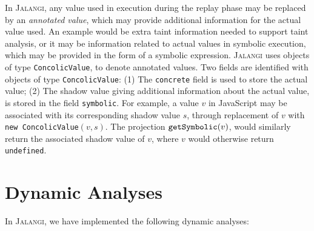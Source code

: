 \documentclass{sig-alternate}
\def\jalangi{\textsc{Jalangi}}
\newcommand \Shadow{{\tt getSymbolic}}
\begin{document}
In \jalangi{}, any value used in execution during the replay phase may
be replaced by an \emph{annotated value}, which may provide additional
information for the actual value used.  An example would be extra
taint information needed to support taint analysis, or it may be
information related to actual values in symbolic execution, which may
be provided in the form of a symbolic expression.  \jalangi{} uses
objects of type \texttt{ConcolicValue}, to denote annotated values.
Two fields are identified with objects of type \texttt{ConcolicValue}:
(1) The \texttt{concrete} field is used to store the actual value; (2)
The shadow value giving additional information about the actual value,
is stored in the field \texttt{symbolic}.  For example, a value $v$ in
JavaScript may be associated with its corresponding shadow value $s$,
through replacement of $v$ with \texttt{new ConcolicValue}$(v, s)$.
The projection $\Shadow(v)$, would similarly return the associated
shadow value of $v$, where $v$ would otherwise return
\texttt{undefined}.


\section{Dynamic Analyses}
\label{sec:dynamic-analyses}

In \jalangi{}, we have implemented the following dynamic analyses:
\end{document}
